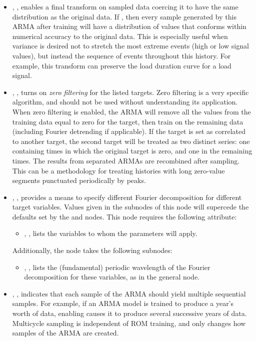 \begin{itemize}
  \item {}, , enables a final transform on sampled
    data coercing it to have the same distribution as the original data. If , then every
    sample generated by this ARMA after training will have a distribution of values that conforms within
    numerical accuracy to the original data. This is especially useful when variance is desired not to stretch
    the most extreme events (high or low signal values), but instead the sequence of events throughout this
    history. For example, this transform can preserve the load duration curve for a load signal.
  \item {}, , turns on \emph{zero filtering}
    for the listed targets. Zero filtering is a very specific algorithm, and should not be used without
    understanding its application.  When zero filtering is enabled, the ARMA will remove all the values from
    the training data equal to zero for the target, then train on the remaining data (including Fourier detrending
    if applicable). If the target is set as correlated to another target, the second target will be treated as
    two distinct series: one containing times in which the original target is zero, and one in the remaining
    times. The results from separated ARMAs are recombined after sampling. This can be a methodology for
    treating histories with long zero-value segments punctuated periodically by peaks.
  \item {}, , provides a means to specify different Fourier
    decomposition for different target variables.  Values given in the subnodes of this node will supercede
    the defaults set by the   and  nodes.  This node
    requires the following attribute:
    \begin{itemize}
      \item {}, , lists the variables to whom
        the  parameters will apply.
    \end{itemize}
    Additionally, the  node takes the following subnodes:
    \begin{itemize}
      \item {}, , lists the (fundamental)
        periodic wavelength of the Fourier decomposition for these variables, as in the  general node.
    \end{itemize}
  \item {}, , indicates that each sample of the ARMA should yield
    multiple sequential samples. For example, if an ARMA model is trained to produce a year's worth of data,
    enabling  causes it to produce several successive years of data. Multicycle sampling
    is independent of ROM training, and only changes how samples of the ARMA are created.


\end{itemize}
